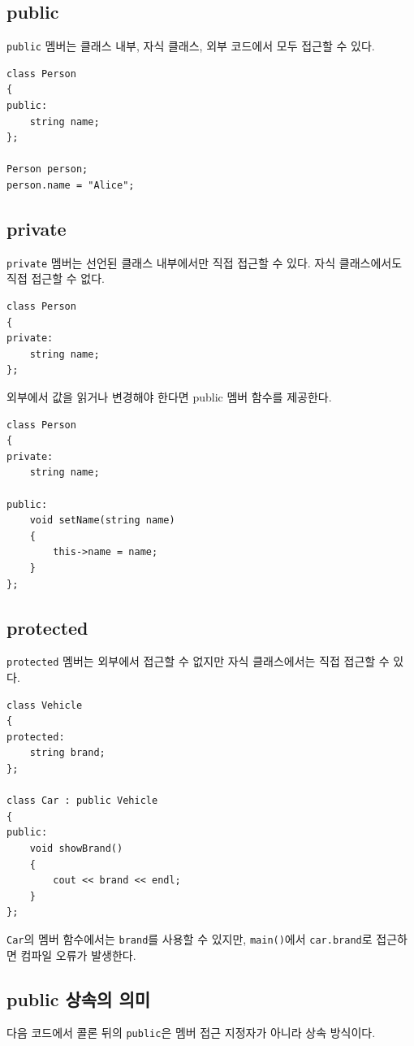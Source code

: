 \documentclass[11pt,a4paper]{article}
\begin{document}
\subsection{public}
\texttt{public} 멤버는 클래스 내부, 자식 클래스, 외부 코드에서 모두 접근할 수 있다.

\begin{lstlisting}
class Person
{
public:
    string name;
};

Person person;
person.name = "Alice";
\end{lstlisting}

\subsection{private}
\texttt{private} 멤버는 선언된 클래스 내부에서만 직접 접근할 수 있다. 자식 클래스에서도 직접 접근할 수 없다.

\begin{lstlisting}
class Person
{
private:
    string name;
};
\end{lstlisting}

외부에서 값을 읽거나 변경해야 한다면 public 멤버 함수를 제공한다.

\begin{lstlisting}
class Person
{
private:
    string name;

public:
    void setName(string name)
    {
        this->name = name;
    }
};
\end{lstlisting}

\subsection{protected}
\texttt{protected} 멤버는 외부에서 접근할 수 없지만 자식 클래스에서는 직접 접근할 수 있다.

\begin{lstlisting}
class Vehicle
{
protected:
    string brand;
};

class Car : public Vehicle
{
public:
    void showBrand()
    {
        cout << brand << endl;
    }
};
\end{lstlisting}

\texttt{Car}의 멤버 함수에서는 \texttt{brand}를 사용할 수 있지만, \texttt{main()}에서 \texttt{car.brand}로 접근하면 컴파일 오류가 발생한다.

\subsection{public 상속의 의미}
다음 코드에서 콜론 뒤의 \texttt{public}은 멤버 접근 지정자가 아니라 상속 방식이다.
\end{document}
